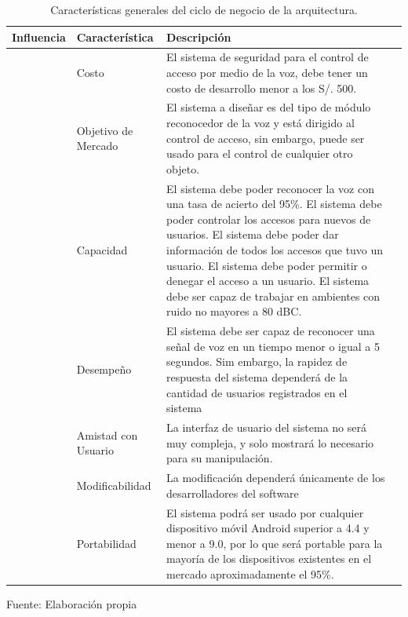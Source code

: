 \begin{center}
\begin{table}[H]
\centering
\caption{\small{Características generales del ciclo de negocio de la arquitectura.}}
\label{table:tabla3.1}
\vskip 0.2cm
\begin{tabular}{|p{3cm}|p{4cm}|p{6cm}|p{3cm}|}
\hline
{\small Influencia} & {\small Característica} & {\small Descripción}  \\ 
\hline 
{\small \multirow{3}{4em}{Negocios}} & {\small Costo} & {\small El sistema de seguridad para el control de acceso por medio de la voz, debe tener un costo de desarrollo menor a los S/. 500.}  \\ 
\cline{2-3}
 & {\small Objetivo de Mercado} & {\small El sistema a diseñar es del tipo de módulo reconocedor de la voz y está dirigido al control de acceso, sin embargo, puede ser usado para el control de cualquier otro objeto.}  \\ 
\cline{2-3}
 & {\small Capacidad} & {\small El sistema debe poder reconocer la voz con una tasa de acierto del 95\%. El sistema debe poder controlar los accesos para nuevos de usuarios. El sistema debe poder dar información de todos los accesos que tuvo un usuario. El sistema debe poder permitir o denegar el acceso a un usuario. El sistema debe ser capaz de trabajar en ambientes con ruido no mayores a 80 dBC.
} \\
\hline 
{\small \multirow{4}{4em}{Técnicos}} & {\small Desempeño} & {\small El sistema debe ser capaz de reconocer una señal de voz en un tiempo menor o igual a 5 segundos. Sim embargo, la rapidez de respuesta del sistema dependerá de la cantidad de usuarios registrados en el sistema}  \\ 
\cline{2-3}
 & {\small Amistad con Usuario} & {\small La interfaz de usuario del sistema no será muy compleja, y solo mostrará lo necesario para su manipulación.}  \\ 
\cline{2-3}
 & {\small Modificabilidad} & {\small La modificación dependerá únicamente de los desarrolladores del software}  \\ 
\cline{2-3}
 & {\small Portabilidad} & {\small El sistema podrá ser usado por cualquier dispositivo móvil Android superior a 4.4
y menor a 9.0, por lo que será portable para la mayoría de los dispositivos existentes en el mercado aproximadamente el 95\%.}  \\ 
\hline 
\end{tabular} 
\begin{center}
\vskip 0.2cm
{\small{Fuente: Elaboración propia}}
\end{center}
\end{table}
\end{center}

